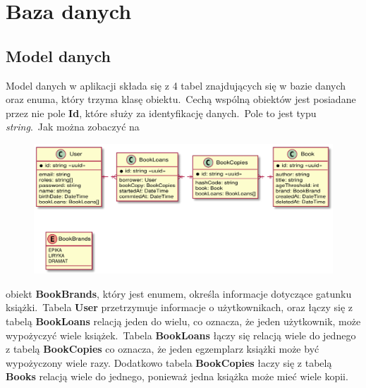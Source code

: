 \chapter{Baza danych}
\section{Model danych}
Model danych w aplikacji składa się z 4 tabel znajdujących się w bazie danych oraz enuma, który trzyma klasę obiektu.\ Cechą wspólną obiektów jest posiadane przez nie pole \textbf{Id}, które służy za identyfikację danych.\ Pole to jest typu \textit{string}.\ Jak można zobaczyć na 

\begin{figure}[H]
    \centering
    \includegraphics[width=\textwidth]{images/class}
    \label{fig:db}
\end{figure}

obiekt \textbf{BookBrands}, który jest enumem, określa informacje dotyczące gatunku książki.\ Tabela \textbf{User} przetrzymuje informacje o użytkownikach, oraz łączy się z tabelą \textbf{BookLoans} relacją jeden do wielu, co oznacza, że jeden użytkownik, może wypożyczyć wiele książek.\ Tabela \textbf{BookLoans} łączy się relacją wiele do jednego z tabelą \textbf{BookCopies} co oznacza, że jeden egzemplarz książki może być wypożyczony wiele razy. Dodatkowo tabela \textbf{BookCopies} łaczy się z tabelą \textbf{Books} relacją wiele do jednego, ponieważ jedna książka może mieć wiele kopii.

